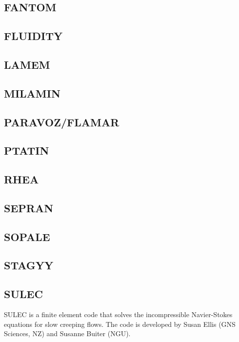 \documentclass[a4paper]{article}
\begin{document}
\subsection{FANTOM}

\subsection{FLUIDITY}

\subsection{LAMEM}

\subsection{MILAMIN}

\subsection{PARAVOZ/FLAMAR}

\subsection{PTATIN}

\subsection{RHEA}

\subsection{SEPRAN}

\subsection{SOPALE}

\subsection{STAGYY}

\subsection{SULEC}
SULEC is a finite element code that solves the incompressible Navier-Stokes equations 
for slow creeping flows. The code is developed by Susan Ellis 
(GNS Sciences, NZ) and Susanne Buiter (NGU). 
\end{document}
